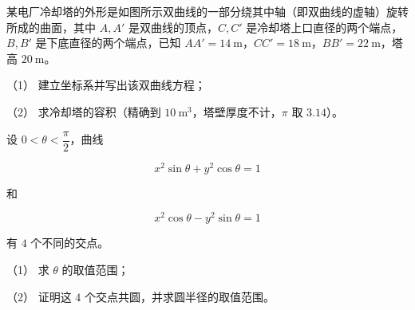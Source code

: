 \begin{question}
某电厂冷却塔的外形是如图所示双曲线的一部分绕其中轴（即双曲线的虚轴）旋转所成的曲面，其中 $A,A'$ 是双曲线的顶点，$C,C'$ 是冷却塔上口直径的两个端点，$B,B'$ 是下底直径的两个端点，已知 $AA'=14\ \mathrm m$，$CC'=18\ \mathrm m$，$BB'=22\ \mathrm m$，塔高 $20\ \mathrm m$。

（1） 建立坐标系并写出该双曲线方程；

（2） 求冷却塔的容积（精确到 $10\ \mathrm m^3$，塔壁厚度不计，$\pi$ 取 $3.14$）。
\nopagebreak[4]
\begin{center}\end{center}
\nopagebreak[4]
\end{question}
\begin{question}
设 $0<\theta<\dfrac\pi2$，曲线

\nopagebreak[4]
\[
x^2\sin\theta+y^2\cos\theta=1
\]

和

\nopagebreak[4]
\[
x^2\cos\theta-y^2\sin\theta=1
\]

有 $4$ 个不同的交点。

（1） 求 $\theta$ 的取值范围；

（2） 证明这 $4$ 个交点共圆，并求圆半径的取值范围。

\end{question}